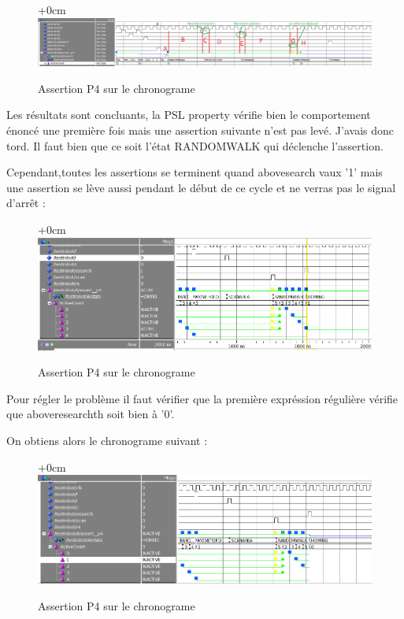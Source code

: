 \documentclass{article}
\begin{document}
\begin{figure}[!h]
\advance\leftskip+0cm
\includegraphics[scale=0.6]{PSL/P4-2.PNG}
\caption{Assertion P4 sur le chronograme }
\end{figure}

Les résultats sont concluants, la PSL property vérifie bien le comportement énoncé une première fois mais une assertion suivante n'est pas levé. J'avais donc tord. Il faut bien que ce soit l'état RANDOMWALK qui déclenche l'assertion. 

Cependant,toutes les assertions se terminent quand abovesearch vaux '1' mais une assertion se lève aussi pendant le début de ce cycle et ne verras pas le signal d'arrêt :

\newpage
\begin{figure}[!h]
\advance\leftskip+0cm
\includegraphics[scale=0.6]{PSL/P4-3.PNG}
\caption{Assertion P4 sur le chronograme }
\end{figure}

Pour régler le problème il faut vérifier que la première expréssion régulière vérifie que aboveresearchth soit bien à '0'.

On obtiens alors le chronograme suivant : 

\begin{figure}[!h]
\advance\leftskip+0cm
\includegraphics[scale=0.6]{PSL/P4-4.PNG}
\caption{Assertion P4 sur le chronograme }
\end{figure}
\end{document}
